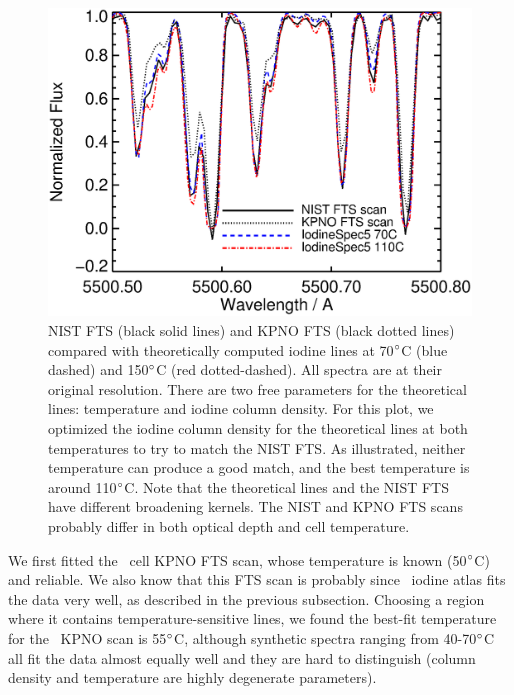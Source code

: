 \begin{figure}
\centering
\includegraphics[scale=0.5]{het/HET_NIST_temp.eps}
\caption{NIST FTS (black solid lines) and KPNO FTS (black dotted
lines) compared with theoretically computed iodine lines at
70$^{\circ}$C (blue dashed) and 150$^{\circ}$C (red dotted-dashed). All
spectra are at their original resolution. There are two free
parameters for the theoretical lines: temperature and iodine column
density. For this plot, we optimized the iodine column density for the
theoretical lines at both temperatures to try to match the NIST FTS. As
illustrated, neither temperature can produce a good match, and the
best temperature is around 110$^{\circ}$C. Note that the
theoretical lines and the NIST FTS have different broadening
kernels. The NIST and KPNO FTS scans probably differ in both optical
depth and cell temperature.
\label{het:fig:nisteyeball}}
\end{figure}

We first fitted the \keck\ cell KPNO FTS scan, whose temperature is
known (50$^{\circ}$C) and reliable. We also know that this FTS scan is
probably  since \keck\ iodine
atlas fits the data very well, as described in the previous
subsection. Choosing a region where it contains temperature-sensitive
lines, we found the best-fit temperature for the \keck\ KPNO scan is
55$^{\circ}$C, although synthetic spectra ranging from 40-70$^{\circ}$C
all fit the data almost equally well and they are hard to distinguish
(column density and temperature are highly degenerate
parameters). 

